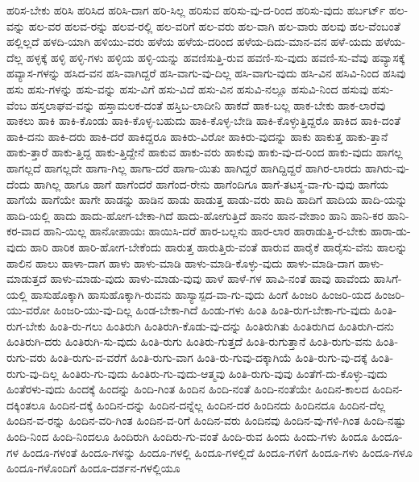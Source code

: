 {ಹರಿಸ-ಬೇಕು
ಹರಿಸಿ
ಹರಿಸಿದ
ಹರಿಸಿ-ದಾಗ
ಹರಿ-ಸಿಲ್ಲ
ಹರಿಸುವ
ಹರಿಸು-ವು-ದ-ರಿಂದ
ಹರಿಸು-ವುದು
ಹರ್ಬರ್ಟ್
ಹಲ-ವನ್ನು
ಹಲ-ವರ
ಹಲವ-ರನ್ನು
ಹಲವ-ರಲ್ಲಿ
ಹಲ-ವರಿಗೆ
ಹಲ-ವರು
ಹಲ-ವಾಗಿ
ಹಲ-ವಾರು
ಹಲವು
ಹಲ-ವೆಂಬಂತೆ
ಹಲ್ಲಿಲ್ಲದೆ
ಹಳದಿ-ಯಾಗಿ
ಹಳಿಯು-ವರು
ಹಳೆಯ
ಹಳೆಯ-ದರಿಂದ
ಹಳೆಯ-ದಿದು-ಮಾನ-ವನ
ಹಳೆ-ಯದು
ಹಳೆಯ-ದೆಲ್ಲ
ಹಳ್ಳಕ್ಕೆ
ಹಳ್ಳಿ
ಹಳ್ಳಿ-ಗಳು
ಹಳ್ಳಿಯ
ಹಳ್ಳಿ-ಯನ್ನು
ಹವಣಿಸುತ್ತಿ-ರುವ
ಹವಣಿ-ಸು-ವುದು
ಹವಣಿ-ಸು-ವೆವು
ಹವ್ಯಾಸಕ್ಕೆ
ಹವ್ಯಾಸ-ಗಳನ್ನು
ಹಸಿದ-ವನ
ಹಸಿ-ವಾಗಿದ್ದರೆ
ಹಸಿ-ವಾಗು-ವು-ದಿಲ್ಲ
ಹಸಿ-ವಾಗು-ವುದು
ಹಸಿ-ವಿನ
ಹಸಿವಿ-ನಿಂದ
ಹಸಿವು
ಹಸು
ಹಸು-ಗಳನ್ನು
ಹಸು-ವನ್ನು
ಹಸು-ವಿಗೆ
ಹಸು-ವಿದೆ
ಹಸು-ವಿನ
ಹಸುವಿ-ನಲ್ಲೂ
ಹಸುವಿ-ನಿಂದ
ಹಸುವು
ಹಸು-ವೆಂಬ
ಹಸ್ತಲಾಘವ-ವನ್ನು
ಹಸ್ತಾಮಲಕ-ದಂತೆ
ಹಸ್ತಿಬ-ಲಾದೀನಿ
ಹಾಕದೆ
ಹಾಕ-ಬಲ್ಲ
ಹಾಕ-ಬೇಕು
ಹಾಕ-ಲಾರೆವು
ಹಾಕಲು
ಹಾಕಿ
ಹಾಕಿ-ಕೊಂಡು
ಹಾಕಿ-ಕೊಳ್ಳ-ಬಹುದು
ಹಾಕಿ-ಕೊಳ್ಳ-ಬೇಡಿ
ಹಾಕಿ-ಕೊಳ್ಳುತ್ತಿದ್ದರೊ
ಹಾಕಿದ
ಹಾಕಿ-ದಂತೆ
ಹಾಕಿ-ದನು
ಹಾಕಿ-ದರು
ಹಾಕಿ-ದರೆ
ಹಾಕಿದ್ದರೂ
ಹಾಕಿರು-ವಿರೋ
ಹಾಕಿರು-ವುದನ್ನು
ಹಾಕು
ಹಾಕುತ್ತ
ಹಾಕು-ತ್ತಾನೆ
ಹಾಕು-ತ್ತಾರೆ
ಹಾಕು-ತ್ತಿದ್ದ
ಹಾಕು-ತ್ತಿದ್ದೇನೆ
ಹಾಕುವ
ಹಾಕು-ವರು
ಹಾಕುವು
ಹಾಕು-ವು-ದ-ರಿಂದ
ಹಾಕು-ವುದು
ಹಾಗಲ್ಲ
ಹಾಗಲ್ಲದೆ
ಹಾಗಲ್ಲದೇ
ಹಾಗಾ-ಗಿಲ್ಲ
ಹಾಗಾ-ದರೆ
ಹಾಗಾ-ಯಿತು
ಹಾಗಿದ್ದರೆ
ಹಾಗಿದ್ದಿದ್ದರೆ
ಹಾಗಿರ-ಲಾರದು
ಹಾಗಿರು-ವು-ದೆಂದು
ಹಾಗಿಲ್ಲ
ಹಾಗೂ
ಹಾಗೆ
ಹಾಗೆಂದರೆ
ಹಾಗೆಂದ-ರೇನು
ಹಾಗೆಂದಿಗೂ
ಹಾಗೆ-ತಟಸ್ಥ-ವಾ-ಗು-ವುವು
ಹಾಗೆಯ
ಹಾಗೆಯೆ
ಹಾಗೆಯೇ
ಹಾಗೇ
ಹಾಡನ್ನು
ಹಾಡಿನ
ಹಾಡು
ಹಾಡುತ್ತ
ಹಾಡು-ವರು
ಹಾದಿ
ಹಾದಿಗೆ
ಹಾದಿಯ
ಹಾದಿ-ಯನ್ನು
ಹಾದಿ-ಯಲ್ಲಿ
ಹಾದು
ಹಾದು-ಹೋಗ-ಬೇಕಾ-ಗಿದೆ
ಹಾದು-ಹೋಗುತ್ತಿದೆ
ಹಾನಂ
ಹಾನ-ವೇಶಾಂ
ಹಾನಿ
ಹಾನಿ-ಕರ
ಹಾನಿ-ಕರ-ವಾದ
ಹಾನಿ-ಯಿಲ್ಲ
ಹಾನೋಪಾಯಃ
ಹಾಯಿಸಿ-ದರೆ
ಹಾರ-ಬಲ್ಲನು
ಹಾರ-ಲಾರ
ಹಾರಾಡುತ್ತಿ-ರ-ಬೇಕು
ಹಾರಾ-ಡು-ವುದು
ಹಾರಿ
ಹಾರಿಕ
ಹಾರಿ-ಹೋಗ-ಬೇಕೆಂದು
ಹಾರುತ್ತ
ಹಾರುತ್ತಿರು-ವಂತೆ
ಹಾರುವ
ಹಾರೈಕೆ
ಹಾರೈಸು-ವೆನು
ಹಾಲನ್ನು
ಹಾಲಿನ
ಹಾಲು
ಹಾಳಾ-ದಾಗ
ಹಾಳು
ಹಾಳು-ಮಾಡಿ
ಹಾಳು-ಮಾಡಿ-ಕೊಳ್ಳು-ವುದು
ಹಾಳು-ಮಾಡಿ-ದಾಗ
ಹಾಳು-ಮಾಡುತ್ತದೆ
ಹಾಳು-ಮಾಡು-ವುದು
ಹಾಳು-ಮಾಡು-ವುವು
ಹಾಳೆ
ಹಾಳೆ-ಗಳ
ಹಾವಿ-ನಂತೆ
ಹಾವು
ಹಾವೆಂದು
ಹಾಸಿಗೆ-ಯಲ್ಲಿ
ಹಾಸುಹೊಕ್ಕಾಗಿ
ಹಾಸುಹೊಕ್ಕಾಗಿ-ರುವನು
ಹಾಸ್ಯಾಸ್ಪದ-ವಾ-ಗು-ವುದು
ಹಿಂಗೆ
ಹಿಂಜರಿ
ಹಿಂಜರಿ-ಯದ
ಹಿಂಜರಿ-ಯು-ವರೋ
ಹಿಂಜರಿ-ಯು-ವು-ದಿಲ್ಲ
ಹಿಂಡ-ಬೇಕಾ-ಗಿದೆ
ಹಿಂಡು-ಗಳು
ಹಿಂತಿ
ಹಿಂತಿ-ರುಗ-ಬೇಕಾ-ಗು-ವುದು
ಹಿಂತಿ-ರುಗ-ಬೇಕು
ಹಿಂತಿ-ರು-ಗಲು
ಹಿಂತಿರುಗಿ
ಹಿಂತಿರುಗಿ-ಕೊಡು-ವು-ದನ್ನು
ಹಿಂತಿರುಗಿತು
ಹಿಂತಿರುಗಿದ
ಹಿಂತಿರುಗಿ-ದನು
ಹಿಂತಿರುಗಿ-ದರು
ಹಿಂತಿರುಗಿ-ಸು-ವುದು
ಹಿಂತಿ-ರುಗು
ಹಿಂತಿರು-ಗುತ್ತದೆ
ಹಿಂತಿ-ರುಗುತ್ತಾನೆ
ಹಿಂತಿ-ರುಗು-ವನು
ಹಿಂತಿ-ರುಗು-ವರು
ಹಿಂತಿ-ರುಗು-ವ-ವರೆಗೆ
ಹಿಂತಿ-ರುಗು-ವಾಗ
ಹಿಂತಿ-ರು-ಗುವು-ದಕ್ಕಾಗಿಯೆ
ಹಿಂತಿ-ರುಗು-ವು-ದಕ್ಕೆ
ಹಿಂತಿ-ರುಗು-ವು-ದಿಲ್ಲ
ಹಿಂತಿರು-ಗು-ವುದು
ಹಿಂತಿರು-ಗು-ವುದು-ಆತ್ಮವು
ಹಿಂತಿ-ರುಗು-ವುವು
ಹಿಂತೆಗೆ-ದು-ಕೊಳ್ಳು-ವುದು
ಹಿಂತೆರಳು-ವುದು
ಹಿಂದಕ್ಕೆ
ಹಿಂದನ್ನು
ಹಿಂದಿ-ಗಿಂತ
ಹಿಂದಿನ
ಹಿಂದಿ-ನಂತೆ
ಹಿಂದಿ-ನಂತೆಯೇ
ಹಿಂದಿನ-ಕಾಲದ
ಹಿಂದಿನ-ದಕ್ಕಿಂತಲೂ
ಹಿಂದಿನ-ದಕ್ಕೆ
ಹಿಂದಿನ-ದನ್ನು
ಹಿಂದಿನ-ದನ್ನೆಲ್ಲ
ಹಿಂದಿನ-ದರ
ಹಿಂದಿನದು
ಹಿಂದಿನದೂ
ಹಿಂದಿನ-ದೆಲ್ಲ
ಹಿಂದಿನ-ವ-ರನ್ನು
ಹಿಂದಿನ-ವರಿ-ಗಿಂತ
ಹಿಂದಿನ-ವ-ರಿಗೆ
ಹಿಂದಿನ-ವರು
ಹಿಂದಿನವು
ಹಿಂದಿನ-ವು-ಗಳಿ-ಗಿಂತ
ಹಿಂದಿ-ನಷ್ಟು
ಹಿಂದಿ-ನಿಂದ
ಹಿಂದಿ-ನಿಂದಲೂ
ಹಿಂದಿರುಗಿ
ಹಿಂದಿರು-ಗು-ವಂತೆ
ಹಿಂದಿ-ರುವ
ಹಿಂದು
ಹಿಂದು-ಗಳು
ಹಿಂದೂ
ಹಿಂದೂ-ಗಳ
ಹಿಂದೂ-ಗಳಂತೆ
ಹಿಂದೂ-ಗಳನ್ನು
ಹಿಂದೂ-ಗಳಲ್ಲಿ
ಹಿಂದೂ-ಗಳಲ್ಲಿದೆ
ಹಿಂದೂ-ಗಳಿಗೆ
ಹಿಂದೂ-ಗಳು
ಹಿಂದೂ-ಗಳೂ
ಹಿಂದೂ-ಗಳೊಂದಿಗೆ
ಹಿಂದೂ-ದರ್ಶನ-ಗಳಲ್ಲಿಯೂ
}
